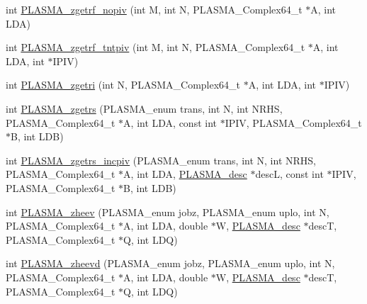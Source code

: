 \begin{DoxyCompactItemize}
\item 
int \hyperlink{group__PLASMA__Complex64__t_ga6fddd4132db9c55950061ff61f1e00e0_ga6fddd4132db9c55950061ff61f1e00e0}{P\+L\+A\+S\+M\+A\+\_\+zgetrf\+\_\+nopiv} (int M, int N, P\+L\+A\+S\+M\+A\+\_\+\+Complex64\+\_\+t $\ast$A, int L\+D\+A)
\item 
int \hyperlink{group__PLASMA__Complex64__t_ga9ab8aca11b7dadc50bcb9dea67cd4954_ga9ab8aca11b7dadc50bcb9dea67cd4954}{P\+L\+A\+S\+M\+A\+\_\+zgetrf\+\_\+tntpiv} (int M, int N, P\+L\+A\+S\+M\+A\+\_\+\+Complex64\+\_\+t $\ast$A, int L\+D\+A, int $\ast$I\+P\+I\+V)
\item 
int \hyperlink{group__PLASMA__Complex64__t_ga96b45d431296d17561924b09a770ce17_ga96b45d431296d17561924b09a770ce17}{P\+L\+A\+S\+M\+A\+\_\+zgetri} (int N, P\+L\+A\+S\+M\+A\+\_\+\+Complex64\+\_\+t $\ast$A, int L\+D\+A, int $\ast$I\+P\+I\+V)
\item 
int \hyperlink{group__PLASMA__Complex64__t_gaf035432f37a7fd4cf2263d1eccaa89a5_gaf035432f37a7fd4cf2263d1eccaa89a5}{P\+L\+A\+S\+M\+A\+\_\+zgetrs} (P\+L\+A\+S\+M\+A\+\_\+enum trans, int N, int N\+R\+H\+S, P\+L\+A\+S\+M\+A\+\_\+\+Complex64\+\_\+t $\ast$A, int L\+D\+A, const int $\ast$I\+P\+I\+V, P\+L\+A\+S\+M\+A\+\_\+\+Complex64\+\_\+t $\ast$B, int L\+D\+B)
\item 
int \hyperlink{group__PLASMA__Complex64__t_ga3af09862f7bf51c6f41e5220859f802d_ga3af09862f7bf51c6f41e5220859f802d}{P\+L\+A\+S\+M\+A\+\_\+zgetrs\+\_\+incpiv} (P\+L\+A\+S\+M\+A\+\_\+enum trans, int N, int N\+R\+H\+S, P\+L\+A\+S\+M\+A\+\_\+\+Complex64\+\_\+t $\ast$A, int L\+D\+A, \hyperlink{structplasma__desc__t}{P\+L\+A\+S\+M\+A\+\_\+desc} $\ast$desc\+L, const int $\ast$I\+P\+I\+V, P\+L\+A\+S\+M\+A\+\_\+\+Complex64\+\_\+t $\ast$B, int L\+D\+B)
\item 
int \hyperlink{group__PLASMA__Complex64__t_gad148e141c13feede49709370caea9c2a_gad148e141c13feede49709370caea9c2a}{P\+L\+A\+S\+M\+A\+\_\+zheev} (P\+L\+A\+S\+M\+A\+\_\+enum jobz, P\+L\+A\+S\+M\+A\+\_\+enum uplo, int N, P\+L\+A\+S\+M\+A\+\_\+\+Complex64\+\_\+t $\ast$A, int L\+D\+A, double $\ast$W, \hyperlink{structplasma__desc__t}{P\+L\+A\+S\+M\+A\+\_\+desc} $\ast$desc\+T, P\+L\+A\+S\+M\+A\+\_\+\+Complex64\+\_\+t $\ast$Q, int L\+D\+Q)
\item 
int \hyperlink{group__PLASMA__Complex64__t_gad7de537e69c66566cc4e8e0b9fbfdb87_gad7de537e69c66566cc4e8e0b9fbfdb87}{P\+L\+A\+S\+M\+A\+\_\+zheevd} (P\+L\+A\+S\+M\+A\+\_\+enum jobz, P\+L\+A\+S\+M\+A\+\_\+enum uplo, int N, P\+L\+A\+S\+M\+A\+\_\+\+Complex64\+\_\+t $\ast$A, int L\+D\+A, double $\ast$W, \hyperlink{structplasma__desc__t}{P\+L\+A\+S\+M\+A\+\_\+desc} $\ast$desc\+T, P\+L\+A\+S\+M\+A\+\_\+\+Complex64\+\_\+t $\ast$Q, int L\+D\+Q)

\end{DoxyCompactItemize}
